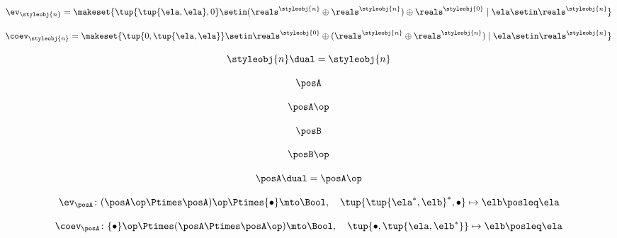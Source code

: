 \begin{forslides}
    \begin{equation}
        \label{eq:slides_trace_monoidal_19}
        \ev_\styleobj{n} = \makeset{\tup{\tup{\ela, \ela},0} \setin (\reals^\styleobj{n} \oplus \reals^\styleobj{n}) \oplus \reals^\styleobj{0} \mid \ela \setin \reals^\styleobj{n}}
    \end{equation}

    \begin{equation}
        \label{eq:slides_trace_monoidal_20}
        \coev_\styleobj{n} = \makeset{\tup{0, \tup{\ela, \ela}} \setin \reals^\styleobj{0} \oplus (\reals^\styleobj{n} \oplus \reals^\styleobj{n}) \mid \ela \setin \reals^\styleobj{n}}
    \end{equation}

    \begin{equation}
        \label{eq:slides_trace_monoidal_21}
        \styleobj{n}\dual = \styleobj{n}
    \end{equation}

    \begin{equation}
        \label{eq:slides_trace_monoidal_22}
        \posA
    \end{equation}

    \begin{equation}
        \label{eq:slides_trace_monoidal_23}
        \posA\op
    \end{equation}

    \begin{equation}
        \label{eq:slides_trace_monoidal_24}
        \posB
    \end{equation}

    \begin{equation}
        \label{eq:slides_trace_monoidal_25}
        \posB\op
    \end{equation}

    \begin{equation}
        \label{eq:slides_trace_monoidal_26}
        \posA\dual = \posA\op
    \end{equation}

    \begin{equation}
        \label{eq:slides_trace_monoidal_27}
        \ev_\posA \colon (\posA\op \Ptimes \posA)\op \Ptimes \{ \bullet \} \mto \Bool, \quad \tup{\tup{\ela^*, \elb}^*, \bullet} \mapsto \elb \posleq \ela
    \end{equation}

    \begin{equation}
        \label{eq:slides_trace_monoidal_28}
        \coev_\posA \colon \{ \bullet \}\op \Ptimes (\posA \Ptimes \posA\op)   \mto \Bool, \quad \tup{\bullet, \tup{\ela, \elb^*}} \mapsto \elb \posleq \ela
    \end{equation}


\end{forslides}
